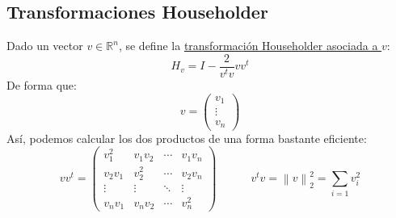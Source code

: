 \subsection{Transformaciones Householder}
Dado un vector \(v \in \mathbb{R}^n\), se define la \underline{transformación Householder asociada a \(v\)}:
\[
        \boxed{H_v = I - \frac{2}{v^tv}vv^t}
\]
De forma que:
\[
        v = \begin{pmatrix}
                v_1    \\
                \vdots \\
                v_n
        \end{pmatrix}
\]
Así, podemos calcular los dos productos de una forma bastante eficiente:
\[
        \boxed{vv^t = \begin{pmatrix}
                        v^2_1   & v_1v_2 & \cdots & v_1 v_n \\
                        v_2v_1  & v_2^2  & \cdots & v_2 v_n \\
                        \vdots  & \vdots & \ddots & \vdots  \\
                        v_n v_1 & v_nv_2 & \cdots & v_n^2
                \end{pmatrix}}
        \hspace{3em}
        \boxed{v^tv = \left \| v \right \|^2_2 = \sum_{i=1}v_i^2}
\]
